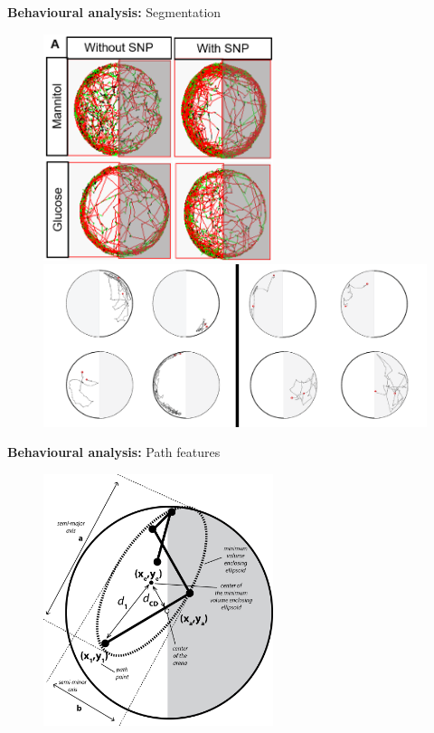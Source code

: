 \documentclass{beamer}
\begin{document}
{\begin{frame}{\textbf{Behavioural analysis:} Segmentation}
\begin{figure}
	\begin{overprint}
		\centerline{\includegraphics[width=0.6\textwidth]{figures/segmentation}}
		\centerline{\includegraphics[width=\textwidth]{figures/segmentation2}}
	\end{overprint}
\end{figure}	
\end{frame}

\begin{frame}{\textbf{Behavioural analysis:} Path features}
	\begin{figure}[H]
		\centering
		\includegraphics[width=0.6\textwidth]{figures/zebrafishfeats}
	\end{figure}	
\end{frame}

}
\end{document}
